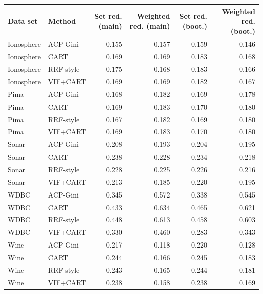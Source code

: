 \begin{tabular}{llrrrr}
\toprule
Data set & Method & Set red. (main) & Weighted red. (main) & Set red. (boot.) & Weighted red. (boot.) \\
\midrule
Ionosphere & ACP-Gini & 0.155 & 0.157 & 0.159 & 0.146 \\
Ionosphere & CART & 0.169 & 0.169 & 0.183 & 0.168 \\
Ionosphere & RRF-style & 0.175 & 0.168 & 0.183 & 0.166 \\
Ionosphere & VIF+CART & 0.169 & 0.169 & 0.182 & 0.167 \\
Pima & ACP-Gini & 0.168 & 0.182 & 0.169 & 0.178 \\
Pima & CART & 0.169 & 0.183 & 0.170 & 0.180 \\
Pima & RRF-style & 0.167 & 0.182 & 0.169 & 0.180 \\
Pima & VIF+CART & 0.169 & 0.183 & 0.170 & 0.180 \\
Sonar & ACP-Gini & 0.208 & 0.193 & 0.204 & 0.195 \\
Sonar & CART & 0.238 & 0.228 & 0.234 & 0.218 \\
Sonar & RRF-style & 0.228 & 0.225 & 0.226 & 0.216 \\
Sonar & VIF+CART & 0.213 & 0.185 & 0.220 & 0.195 \\
WDBC & ACP-Gini & 0.345 & 0.572 & 0.338 & 0.545 \\
WDBC & CART & 0.433 & 0.634 & 0.465 & 0.621 \\
WDBC & RRF-style & 0.448 & 0.613 & 0.458 & 0.603 \\
WDBC & VIF+CART & 0.330 & 0.460 & 0.283 & 0.343 \\
Wine & ACP-Gini & 0.217 & 0.118 & 0.220 & 0.128 \\
Wine & CART & 0.244 & 0.166 & 0.245 & 0.183 \\
Wine & RRF-style & 0.243 & 0.165 & 0.244 & 0.181 \\
Wine & VIF+CART & 0.238 & 0.158 & 0.238 & 0.169 \\
\bottomrule
\end{tabular}
